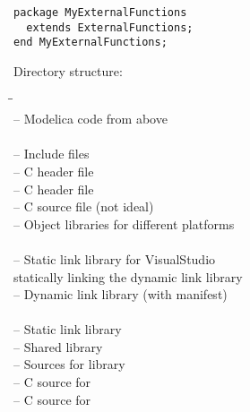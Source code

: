\begin{example}
\begin{lstlisting}[language=modelica]
package MyExternalFunctions
  extends ExternalFunctions;
end MyExternalFunctions;
\end{lstlisting}
Directory structure:
\ifpdf
\else
\par
\fi
{\upshape
\begin{tabbing}
\hspace{15em}\=\hspace{1em}\=\kill
{}\\
\quad{}                        \>-- \>Modelica code from above\\
\quad{}\\
\quad\quad{}                      \>-- \>Include files\\
\quad\quad\quad{}         \>-- \>C header file\\
\quad\quad\quad{}         \>-- \>C header file\\
\quad\quad\quad{}         \>-- \>C source file (not ideal)\\
\quad\quad{}                      \>-- \>Object libraries for different platforms\\
\quad\quad\quad{}\\
\quad\quad\quad\quad{}   \>-- \>Static link library for VisualStudio\\
\quad\quad\quad\quad{}   \>   \>statically linking the dynamic link library\\
\quad\quad\quad\quad{}   \>-- \>Dynamic link library (with manifest)\\
\quad\quad\quad{}\\
\quad\quad\quad\quad{}  \>-- \>Static link library\\
\quad\quad\quad\quad{} \>-- \>Shared library\\
\quad\quad{}                       \>-- \>Sources for library\\
\quad\quad\quad{}                 \>-- \>C source for \\
\quad\quad\quad{}                 \>-- \>C source for \\

\end{tabbing}}
\end{example}
